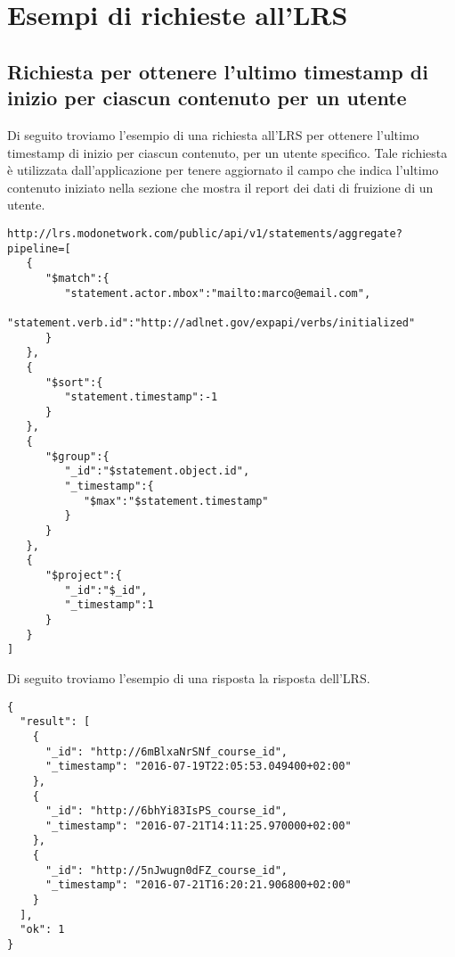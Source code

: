 \section{Esempi di richieste all'LRS} \label{App:AppendixB}
    \subsection{Richiesta per ottenere l'ultimo timestamp di inizio per ciascun contenuto per un utente}
    Di seguito troviamo l'esempio di una richiesta all'LRS per ottenere l'ultimo timestamp di inizio per ciascun contenuto, per un utente specifico. Tale richiesta è utilizzata dall'applicazione per tenere aggiornato il campo che indica l'ultimo contenuto iniziato nella sezione che mostra il report dei dati di fruizione di un utente.
\begin{lstlisting}
http://lrs.modonetwork.com/public/api/v1/statements/aggregate?pipeline=[
   {
      "$match":{
         "statement.actor.mbox":"mailto:marco@email.com",
         "statement.verb.id":"http://adlnet.gov/expapi/verbs/initialized"
      }
   },
   {
      "$sort":{
         "statement.timestamp":-1
      }
   },
   {
      "$group":{
         "_id":"$statement.object.id",
         "_timestamp":{
            "$max":"$statement.timestamp"
         }
      }
   },
   {
      "$project":{
         "_id":"$_id",
         "_timestamp":1
      }
   }
]
\end{lstlisting}
    
    Di seguito troviamo l'esempio di una risposta la risposta dell'LRS.
\begin{lstlisting}
{
  "result": [
    {
      "_id": "http://6mBlxaNrSNf_course_id",
      "_timestamp": "2016-07-19T22:05:53.049400+02:00"
    },
    {
      "_id": "http://6bhYi83IsPS_course_id",
      "_timestamp": "2016-07-21T14:11:25.970000+02:00"
    },
    {
      "_id": "http://5nJwugn0dFZ_course_id",
      "_timestamp": "2016-07-21T16:20:21.906800+02:00"
    }
  ],
  "ok": 1
}
\end{lstlisting}

